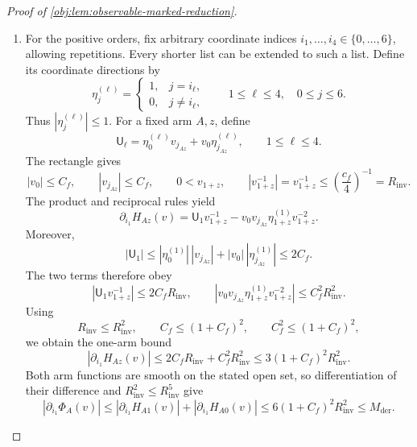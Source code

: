 \begin{proof}[Proof of \cref{obj:lem:observable-marked-reduction}]
\begin{enumerate}
\item For the positive orders, fix arbitrary coordinate indices
\(i_1,\ldots,i_4\in\{0,\ldots,6\}\), allowing repetitions. Every shorter list can be extended to such a list. Define its coordinate directions by
\[
\eta^{(\ell)}_j=
\begin{cases}
1,&j=i_\ell,\\
0,&j\ne i_\ell,
\end{cases}
\qquad 1\le\ell\le4,\quad 0\le j\le6.
\]
Thus \(|\eta^{(\ell)}_j|\le1\). For a fixed arm \(A,z\), define
\[
\mathsf U_\ell
=\eta^{(\ell)}_0v_{j_{Az}}
 +v_0\eta^{(\ell)}_{j_{Az}},
\qquad 1\le\ell\le4.
\]
The rectangle gives
\[
|v_0|\le C_f,\qquad |v_{j_{Az}}|\le C_f,\qquad
0<v_{1+z},\qquad
|v_{1+z}^{-1}|
=v_{1+z}^{-1}
\le\left(\frac{c_f}{4}\right)^{-1}
=R_{\mathrm{inv}}.
\]
The product and reciprocal rules yield
\[
\partial_{i_1}H_{Az}(v)
=\mathsf U_1v_{1+z}^{-1}
-v_0v_{j_{Az}}\eta^{(1)}_{1+z}v_{1+z}^{-2}.
\]
Moreover,
\[
|\mathsf U_1|
\le|\eta^{(1)}_0|\,|v_{j_{Az}}|
   +|v_0|\,|\eta^{(1)}_{j_{Az}}|
\le2C_f.
\]
The two terms therefore obey
\[
|\mathsf U_1v_{1+z}^{-1}|\le2C_fR_{\mathrm{inv}},
\qquad
|v_0v_{j_{Az}}\eta^{(1)}_{1+z}v_{1+z}^{-2}|
\le C_f^2R_{\mathrm{inv}}^2.
\]
Using
\[
R_{\mathrm{inv}}\le R_{\mathrm{inv}}^2,\qquad
C_f\le(1+C_f)^2,\qquad
C_f^2\le(1+C_f)^2,
\]
we obtain the one-arm bound
\[
|\partial_{i_1}H_{Az}(v)|
\le2C_fR_{\mathrm{inv}}+C_f^2R_{\mathrm{inv}}^2
\le3(1+C_f)^2R_{\mathrm{inv}}^2.
\]
Both arm functions are smooth on the stated open set, so differentiation of their difference and \(R_{\mathrm{inv}}^2\le R_{\mathrm{inv}}^5\) give
\[
|\partial_{i_1}\Phi_A(v)|
\le|\partial_{i_1}H_{A1}(v)|
  +|\partial_{i_1}H_{A0}(v)|
\le6(1+C_f)^2R_{\mathrm{inv}}^2
\le M_{\mathrm{der}}.
\]


\end{enumerate}
\end{proof}
